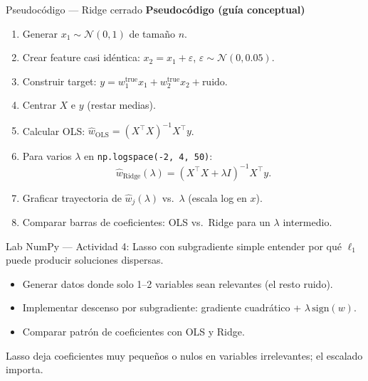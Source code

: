 \begin{frame}{Pseudocódigo — Ridge cerrado}
\footnotesize
\textbf{Pseudocódigo (guía conceptual)}
\begin{enumerate}\footnotesize
  \item Generar $x_1\sim\mathcal{N}(0,1)$ de tamaño $n$.
  \item Crear feature casi idéntica: $x_2 = x_1 + \varepsilon$,\; $\varepsilon\sim\mathcal{N}(0, 0.05)$.
  \item Construir target: $y = w_1^{\mathrm{true}} x_1 + w_2^{\mathrm{true}} x_2 + \text{ruido}$.
  \item Centrar $X$ e $y$ (restar medias).
  \item Calcular OLS: $\hat w_{\mathrm{OLS}} = (X^\top X)^{-1}X^\top y$.
  \item Para varios $\lambda$ en \texttt{np.logspace(-2, 4, 50)}:
  \[
    \hat w_{\mathrm{Ridge}}(\lambda) = (X^\top X + \lambda I)^{-1}X^\top y.
  \]
  \item Graficar trayectoria de $\hat w_j(\lambda)$ vs.\ $\lambda$ (escala log en $x$).
  \item Comparar barras de coeficientes: OLS vs.\ Ridge para un $\lambda$ intermedio.
\end{enumerate}
\end{frame}

\begin{frame}{Lab NumPy — Actividad 4: Lasso con subgradiente simple}
 entender por qué $\ell_1$ puede producir soluciones dispersas.
\begin{itemize}\small
  \item Generar datos donde solo 1--2 variables sean relevantes (el resto ruido).
  \item Implementar descenso por subgradiente: gradiente cuadrático + $\lambda\,\mathrm{sign}(w)$.
  \item Comparar patrón de coeficientes con OLS y Ridge.
\end{itemize}

\vspace{0.2em}
Lasso deja coeficientes muy pequeños o nulos en variables irrelevantes; el escalado importa.
\end{frame}

